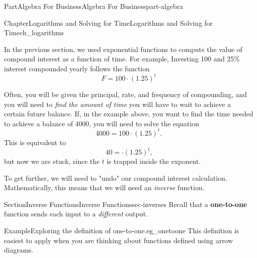 \documentclass{tufte-book}
\newcommand{\terminology}[1]{\textbf{#1}}
\numberwithin{equation}{chapter}
\begin{document}
\begin{partptx}{Part}{Algebra For Business}{}{Algebra For Business}{}{}{part-algebra}
\typeout{************************************************}
%
\begin{chapterptx}{Chapter}{Logarithms and Solving for Time}{}{Logarithms and Solving for Time}{}{}{ch_logarithms}
\renewcommand*{\chaptername}{Chapter}
\begin{introduction}{}%
In the previous section, we used exponential functions to compute the value of compound interest as a function of time.  For example, Investing \textdollar{}100 and 25\% interest compounded yearly follows the function%
\begin{equation*}
F = 100\cdot (1.25)^t
\end{equation*}
%
\par
Often, you will be given the principal, rate, and frequency of compounding, and you will need to \emph{find the amount of time} you will have to wait to achieve a certain future balance.  If, in the example above, you want to find the time needed to achieve a balance of \textdollar{}4000, you will need to solve the equation%
\begin{equation*}
4000 = 100\cdot (1.25)^t\text{.}
\end{equation*}
This is equivalent to%
\begin{equation*}
40 = \cdot (1.25)^t\text{,}
\end{equation*}
but now we are stuck, since the \(t\) is trapped inside the exponent.%
\par
To get further, we will need to "undo" our compound interest calculation. Mathematically, this means that we will need an \emph{inverse} function.%
\end{introduction}%
%
%
\typeout{************************************************}
\typeout{************************************************}
%
\begin{sectionptx}{Section}{Inverse Functions}{}{Inverse Functions}{}{}{sec-inverses}
Recall that a \terminology{one-to-one} function sends each input to a \emph{different} output.%
\begin{example}{Example}{Exploring the definition of one-to-one.}{eg_onetoone}%
This definition is easiest to apply when you are thinking about functions defined using arrow diagrams.%
\begin{image}{0}{1}{0}{}%
\end{image}
\end{example}
\end{sectionptx}
\end{chapterptx}
\end{partptx}
\end{document}
